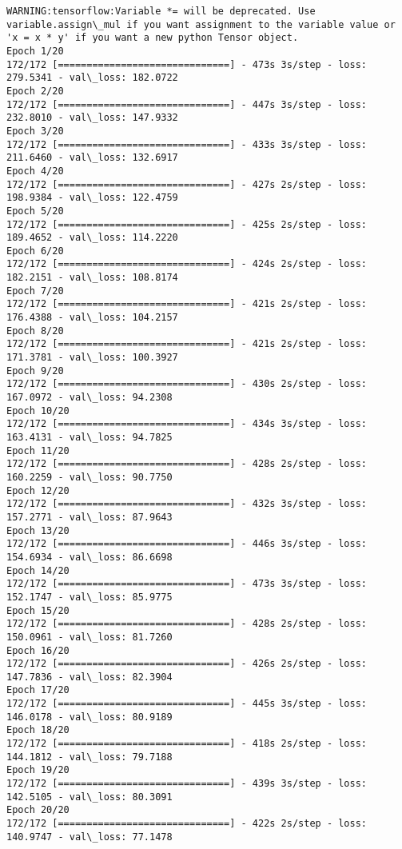 \documentclass[11pt]{article}
\begin{document}
    \begin{Verbatim}[commandchars=\\\{\}]
WARNING:tensorflow:Variable *= will be deprecated. Use variable.assign\_mul if you want assignment to the variable value or 'x = x * y' if you want a new python Tensor object.
Epoch 1/20
172/172 [==============================] - 473s 3s/step - loss: 279.5341 - val\_loss: 182.0722
Epoch 2/20
172/172 [==============================] - 447s 3s/step - loss: 232.8010 - val\_loss: 147.9332
Epoch 3/20
172/172 [==============================] - 433s 3s/step - loss: 211.6460 - val\_loss: 132.6917
Epoch 4/20
172/172 [==============================] - 427s 2s/step - loss: 198.9384 - val\_loss: 122.4759
Epoch 5/20
172/172 [==============================] - 425s 2s/step - loss: 189.4652 - val\_loss: 114.2220
Epoch 6/20
172/172 [==============================] - 424s 2s/step - loss: 182.2151 - val\_loss: 108.8174
Epoch 7/20
172/172 [==============================] - 421s 2s/step - loss: 176.4388 - val\_loss: 104.2157
Epoch 8/20
172/172 [==============================] - 421s 2s/step - loss: 171.3781 - val\_loss: 100.3927
Epoch 9/20
172/172 [==============================] - 430s 2s/step - loss: 167.0972 - val\_loss: 94.2308
Epoch 10/20
172/172 [==============================] - 434s 3s/step - loss: 163.4131 - val\_loss: 94.7825
Epoch 11/20
172/172 [==============================] - 428s 2s/step - loss: 160.2259 - val\_loss: 90.7750
Epoch 12/20
172/172 [==============================] - 432s 3s/step - loss: 157.2771 - val\_loss: 87.9643
Epoch 13/20
172/172 [==============================] - 446s 3s/step - loss: 154.6934 - val\_loss: 86.6698
Epoch 14/20
172/172 [==============================] - 473s 3s/step - loss: 152.1747 - val\_loss: 85.9775
Epoch 15/20
172/172 [==============================] - 428s 2s/step - loss: 150.0961 - val\_loss: 81.7260
Epoch 16/20
172/172 [==============================] - 426s 2s/step - loss: 147.7836 - val\_loss: 82.3904
Epoch 17/20
172/172 [==============================] - 445s 3s/step - loss: 146.0178 - val\_loss: 80.9189
Epoch 18/20
172/172 [==============================] - 418s 2s/step - loss: 144.1812 - val\_loss: 79.7188
Epoch 19/20
172/172 [==============================] - 439s 3s/step - loss: 142.5105 - val\_loss: 80.3091
Epoch 20/20
172/172 [==============================] - 422s 2s/step - loss: 140.9747 - val\_loss: 77.1478

    \end{Verbatim}
\end{document}
